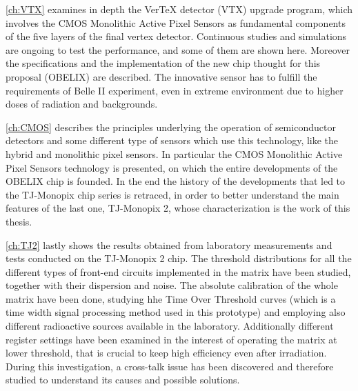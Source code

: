 \autoref{ch:VTX} examines in depth the VerTeX detector (VTX) upgrade program, which involves the CMOS Monolithic Active Pixel Sensors as fundamental components of the five layers of the final vertex detector. Continuous studies and simulations are ongoing to test the performance, and some of them are shown here. Moreover the specifications and the implementation of the new chip thought for this proposal (OBELIX) are described. The innovative sensor has to fulfill the requirements of Belle II experiment, even in extreme environment due to higher doses of radiation and backgrounds.

\autoref{ch:CMOS} describes the principles underlying the operation of semiconductor detectors and some different type of sensors which use this technology, like the hybrid and monolithic pixel sensors. In particular the CMOS Monolithic Active Pixel Sensors technology is presented, on which the entire developments of the OBELIX chip is founded. In the end the history of the developments that led to the TJ-Monopix chip series is retraced, in order to better understand the main features of the last one, TJ-Monopix 2, whose characterization is the work of this thesis.

\autoref{ch:TJ2} lastly shows the results obtained from laboratory measurements and tests conducted on the TJ-Monopix 2 chip. The threshold distributions for all the different types of front-end circuits implemented in the matrix have been studied, together with their dispersion and noise. The absolute calibration of the whole matrix have been done, studying hhe Time Over Threshold curves (which is a time width signal processing method used in this prototype) and employing also different radioactive sources available in the laboratory. Additionally different register settings have been examined in the interest of operating the matrix at lower threshold, that is crucial to keep high efficiency even after irradiation. During this investigation, a cross-talk issue has been discovered and therefore studied to understand its causes and possible solutions.





